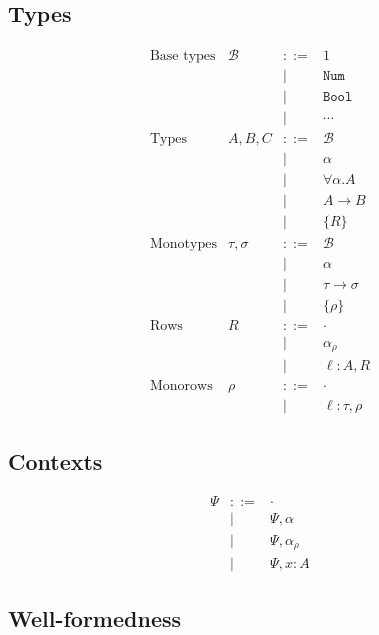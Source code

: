 \documentclass{article}
\newcommand{\code}[1]{\texttt{#1}}
\newcommand{\rcd}[1]{\{#1\}}
\newcommand{\B}{\mathcal{B}}
\newcommand{\rowvar}{\alpha_\rho}
\newcommand{\define}{::=}
\begin{document}
\subsection{Types}
\[
  \begin{array}{llcl}
    \text{Base types} & \B & \define & 1 \\
                      & & | & \code{Num} \\
                      & & | & \code{Bool} \\
                      & & | & \cdots \\
    \text{Types} & A, B, C & \define & \B \\
                      & & | & \alpha \\
                      & & | & \forall \alpha. A \\
                      & & | & A \to B \\
                      & & | & \rcd{R} \\
    \text{Monotypes} & \tau, \sigma & \define & \B \\
                      & & | & \alpha \\
                      & & | & \tau \to \sigma \\
                      & & | & \rcd{\rho} \\
    \text{Rows} & R & \define & \cdot \\
                      & & | & \rowvar \\
                      & & | & \ell : A, R \\
    \text{Monorows} & \rho & \define & \cdot \\
                      & & | & \ell : \tau, \rho
  \end{array}
\]

\subsection{Contexts}
\[
  \begin{array}{lcl}
    \Psi & \define & \cdot \\
         & | & \Psi, \alpha \\
         & | & \Psi, \rowvar \\
         & | & \Psi, x : A
    
  \end{array}
\]

\subsection{Well-formedness}
\end{document}
